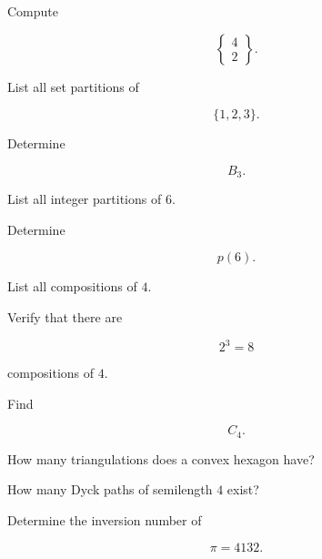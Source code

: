 \begin{exercise}[1]
Compute

\[
\left\{
\begin{matrix}
4\\
2
\end{matrix}
\right\}.
\]
\end{exercise}

\begin{exercise}[1]
List all set partitions of

\[
\{1,2,3\}.
\]
\end{exercise}

\begin{exercise}[1]
Determine

\[
B_3.
\]
\end{exercise}

\begin{exercise}[1]
List all integer partitions of \(6\).
\end{exercise}

\begin{exercise}[1]
Determine

\[
p(6).
\]
\end{exercise}

\begin{exercise}[1]
List all compositions of \(4\).
\end{exercise}

\begin{exercise}[1]
Verify that there are

\[
2^3=8
\]

compositions of \(4\).
\end{exercise}

\begin{exercise}[1]
Find

\[
C_4.
\]
\end{exercise}

\begin{exercise}[1]
How many triangulations does a convex hexagon have?
\end{exercise}

\begin{exercise}[1]
How many Dyck paths of semilength \(4\) exist?
\end{exercise}

\begin{exercise}[1]
Determine the inversion number of

\[
\pi=4132.
\]
\end{exercise}

